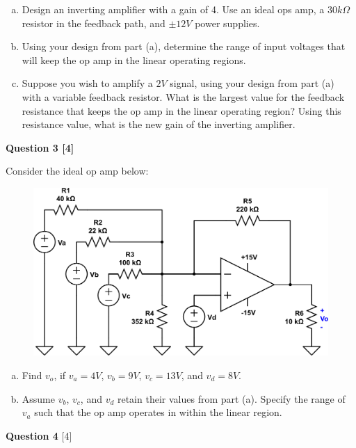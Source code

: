 \documentclass[12pt]{article}
\begin{document}
\begin{enumerate}[(a)]
\item Design an inverting amplifier with a gain of 4. Use an ideal ops amp, a $30 k \Omega$ resistor in the feedback path, and $\pm 12V$ power supplies. 
\item Using your design from part (a), determine the range of input voltages that will keep the op amp in the linear operating regions.  
\item Suppose you wish to amplify a $2V$ signal, using your design from part (a) with a variable feedback resistor. What is the largest value for the feedback resistance that keeps the op amp in the linear operating region? Using this resistance value, what is the new gain of the inverting amplifier. 
\end{enumerate}

\newpage

{\bf Question 3 [4]} %

Consider the ideal op amp below:

\begin{figure}[h!]
\begin{center}
 \includegraphics[scale=0.4]{p5_16.png}
\end{center}
\end{figure}

\begin{enumerate}[(a)]
\item Find $v_o$, if $v_a = 4V$, $v_b = 9V$, $v_c = 13V$, and $v_d = 8V$.
\item Assume $v_b$, $v_c$, and $v_d$ retain their values from part (a). Specify the range of $v_a$ such that the op amp operates in within the linear region.
\end{enumerate}

{\bf Question 4} [4] %
\end{document}
